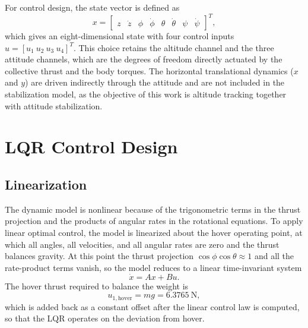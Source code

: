 \documentclass[conference]{IEEEtran}
\begin{document}
For control design, the state vector is defined as
\begin{equation}
x = \begin{bmatrix} z & \dot{z} & \phi & \dot{\phi} & \theta & \dot{\theta} & \psi & \dot{\psi} \end{bmatrix}^{T},
\end{equation}
which gives an eight-dimensional state with four control inputs $u = [u_1\ u_2\ u_3\ u_4]^{T}$. This choice retains the altitude channel and the three attitude channels, which are the degrees of freedom directly actuated by the collective thrust and the body torques. The horizontal translational dynamics ($x$ and $y$) are driven indirectly through the attitude and are not included in the stabilization model, as the objective of this work is altitude tracking together with attitude stabilization.

\section{LQR Control Design}
\subsection{Linearization}
The dynamic model is nonlinear because of the trigonometric terms in the thrust projection and the products of angular rates in the rotational equations. To apply linear optimal control, the model is linearized about the hover operating point, at which all angles, all velocities, and all angular rates are zero and the thrust balances gravity. At this point the thrust projection $\cos\phi\cos\theta \approx 1$ and all the rate-product terms vanish, so the model reduces to a linear time-invariant system
\begin{equation}
\dot{x} = Ax + Bu.
\end{equation}
The hover thrust required to balance the weight is
\begin{equation}
u_{1,\text{hover}} = mg = 6.3765~\text{N},
\end{equation}
which is added back as a constant offset after the linear control law is computed, so that the LQR operates on the deviation from hover.
\end{document}
